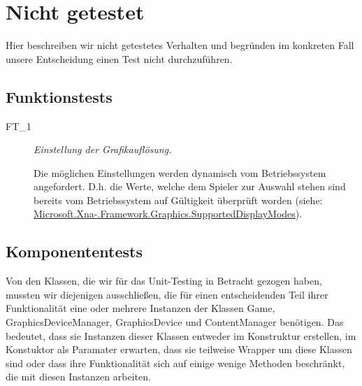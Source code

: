 %



\newpage



\section{Nicht getestet}
\label{Abschnitt:Tests:Nicht}

Hier beschreiben wir nicht getestetes Verhalten und begründen im konkreten Fall unsere Entscheidung einen Test nicht durchzuführen.
~\\




\subsection*{Funktionstests}
\label{Abschnitt:Tests:Nicht:Funktion}

\begin{description}

	\item[FT\_1] \textit{Einstellung der Grafikauflösung.} \hfill\\
	
	\label{FT:1}
	
	Die möglichen Einstellungen werden dynamisch vom Betriebssystem angefordert. D.h. die Werte, welche dem Spieler zur Auswahl stehen sind bereits vom Betriebssystem auf Gültigkeit überprüft worden (siehe:  \href{http://msdn.microsoft.com/de-de/library/microsoft.xna.framework.graphics.graphicsadapter.supporteddisplaymodes}{Microsoft.Xna-.Framework.Graphics.SupportedDisplayModes}).
	~\\
	
\end{description}




\subsection*{Komponententests}
\label{Abschnitt:Tests:Nicht:Komponenten}

Von den Klassen, die wir für das Unit-Testing in Betracht gezogen haben, mussten wir diejenigen ausschließen, die für einen entscheidenden Teil ihrer Funktionalität eine oder mehrere Instanzen der Klassen Game, GraphicsDeviceManager, GraphicsDevice und ContentManager benötigen. Das bedeutet, dass sie Instanzen dieser Klassen entweder im Konstruktur erstellen, im Konstuktor als Paramater erwarten, dass sie teilweise Wrapper um diese Klassen sind oder dass ihre Funktionalität sich auf einige wenige Methoden beschränkt, die mit diesen Instanzen arbeiten.

